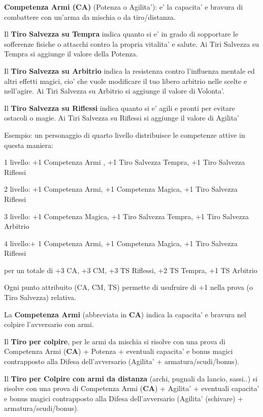 \documentclass[a4paper,11pt,twoside,openany]{book}
\begin{document}
\textbf{Competenza Armi (CA)} (Potenza o Agilita'): e' la capacita' e bravura di combattere con un'arma da mischia o da tiro/distanza.

Il \textbf{Tiro Salvezza su Tempra} indica quanto si e' in grado di sopportare le sofferenze fisiche o attacchi contro la propria vitalita' e salute. Ai Tiri Salvezza su Tempra si aggiunge il valore della Potenza. 

Il \textbf{Tiro Salvezza su Arbitrio} indica la resistenza contro l'influenza mentale ed altri effetti magici, cio' che vuole modificare il tuo libero arbitrio nelle scelte e nell'agire. Ai Tiri Salvezza su Arbitrio si aggiunge il valore di Volonta'.

Il \textbf{Tiro Salvezza su Riflessi} indica quanto si e' agili e pronti per evitare ostacoli o magie. Ai Tiri Salvezza su Riflessi si aggiunge il valore di Agilita'

\bigskip

Esempio: un personaggio di quarto livello distribuisce le competenze
attive in questa maniera:

1 livello: +1 Competenza Armi , +1 Tiro Salvezza Tempra, +1 Tiro Salvezza Riflessi

2 livello: +1 Competenza Armi, +1 Competenza Magica, +1 Tiro Salvezza Riflessi

3 livello: +1 Competenza Magica, +1 Tiro Salvezza Tempra, +1 Tiro Salvezza Arbitrio

4 livello:+ 1 Competenza Armi, +1 Competenza Magica, +1 Tiro Salvezza Riflessi

per un totale di +3 CA, +3 CM, +3 TS Riflessi, +2 TS Tempra, +1 TS Arbitrio

\bigskip

Ogni punto attribuito (CA, CM, TS) permette di usufruire di +1 nella prova (o Tiro Salvezza) relativa.

La \textbf{Competenza Armi} (abbreviata in \textbf{CA}) indica la capacita' e bravura nel colpire l'avversario con armi.

Il \textbf{Tiro per colpire}, per le armi da mischia si risolve con una prova di Competenza Armi (\textbf{CA}) + Potenza + eventuali capacita' e bonus magici contrapposto alla Difesa dell'avversario (Agilita' + armatura/scudi/bonus).

Il \textbf{Tiro per Colpire con armi da distanza} (archi, pugnali da lancio, sassi..) si risolve con una prova di Competenza Armi (\textbf{CA}) + Agilita' + eventuali capacita' e bonus magici contrapposto alla Difesa dell'avversario (Agilita' (schivare) + armatura/scudi/bonus).
\end{document}
